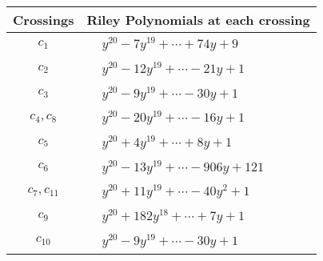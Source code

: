 \documentclass[1p]{elsarticle_modified}
\theoremstyle{definition}
\begin{document}
\begin{tabular}{m{50pt}|m{274pt}}
Crossings & \hspace{64pt}Riley Polynomials at each crossing \\
\hline $$\begin{aligned}c_{1}\end{aligned}$$&$\begin{aligned}
&y^{20}-7 y^{19}+\cdots+74 y+9
\end{aligned}$\\
\hline $$\begin{aligned}c_{2}\end{aligned}$$&$\begin{aligned}
&y^{20}-12 y^{19}+\cdots-21 y+1
\end{aligned}$\\
\hline $$\begin{aligned}c_{3}\end{aligned}$$&$\begin{aligned}
&y^{20}-9 y^{19}+\cdots-30 y+1
\end{aligned}$\\
\hline $$\begin{aligned}c_{4},c_{8}\end{aligned}$$&$\begin{aligned}
&y^{20}-20 y^{19}+\cdots-16 y+1
\end{aligned}$\\
\hline $$\begin{aligned}c_{5}\end{aligned}$$&$\begin{aligned}
&y^{20}+4 y^{19}+\cdots+8 y+1
\end{aligned}$\\
\hline $$\begin{aligned}c_{6}\end{aligned}$$&$\begin{aligned}
&y^{20}-13 y^{19}+\cdots-906 y+121
\end{aligned}$\\
\hline $$\begin{aligned}c_{7},c_{11}\end{aligned}$$&$\begin{aligned}
&y^{20}+11 y^{19}+\cdots-40 y^2+1
\end{aligned}$\\
\hline $$\begin{aligned}c_{9}\end{aligned}$$&$\begin{aligned}
&y^{20}+182 y^{18}+\cdots+7 y+1
\end{aligned}$\\
\hline $$\begin{aligned}c_{10}\end{aligned}$$&$\begin{aligned}
&y^{20}-9 y^{19}+\cdots-30 y+1
\end{aligned}$\\
\hline
\end{tabular}\\~\\
\end{document}
